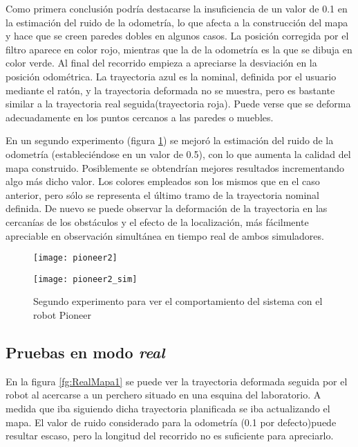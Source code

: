  Como primera conclusión podría destacarse la insuficiencia de un valor de 0.1 en la estimación del ruido de la odometría, lo que afecta a la construcción del mapa y hace que se creen paredes dobles en algunos casos. La posición corregida por el filtro aparece en color rojo, mientras que la de la odometría es la que se dibuja en color verde. Al final del recorrido empieza a apreciarse la desviación en la posición odométrica. La trayectoria azul es la nominal, definida por el usuario mediante el ratón, y la trayectoria deformada no se muestra, pero es bastante similar a la trayectoria real seguida(trayectoria roja). Puede verse que se deforma adecuadamente en los puntos cercanos a las paredes o muebles.

 En un segundo experimento (figura \ref{fg:pioneerSim1b}) se mejoró la estimación del ruido de la odometría (estableciéndose en un valor de 0.5), con lo que aumenta la calidad del mapa construido. Posiblemente se obtendrían mejores resultados incrementando algo más dicho valor. Los colores empleados son los mismos que en el caso anterior, pero sólo se representa el último tramo de la trayectoria nominal definida. De nuevo se puede observar la deformación de la trayectoria en las cercanías de los obstáculos y el efecto de la localización, más fácilmente apreciable en observación simultánea en tiempo real de ambos simuladores.

 \begin{figure}[h]
  \centering\texttt{[image: pioneer2]}

  \vspace{0.5cm}

  \centering\texttt{[image: pioneer2\_sim]}
  \caption{Segundo experimento para ver el comportamiento del sistema con el robot Pioneer}\label{fg:pioneerSim1b}
\end{figure}

\clearpage
\subsection{Pruebas en modo \emph{real}}

En la figura \ref{fg:RealMapa1} se puede ver la trayectoria deformada seguida por el robot al acercarse a un perchero situado en una esquina del laboratorio. A medida que iba siguiendo dicha trayectoria planificada se iba actualizando el mapa. El valor de ruido considerado para la odometría (0.1 por defecto)puede resultar escaso, pero la longitud del recorrido no es suficiente para apreciarlo.

